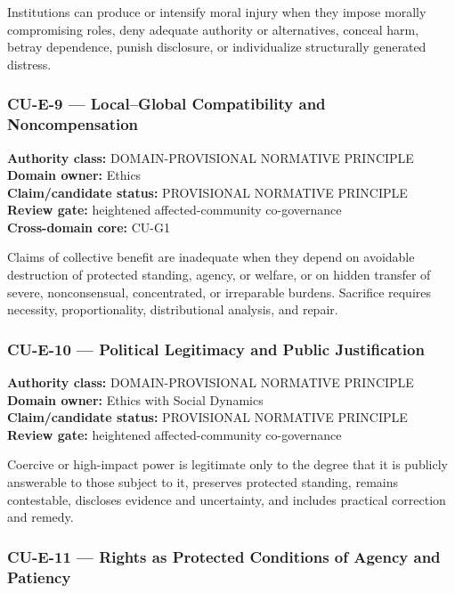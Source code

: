 \documentclass[
  11pt,
]{article}
\begin{document}
Institutions can produce or intensify moral injury when they impose
morally compromising roles, deny adequate authority or alternatives,
conceal harm, betray dependence, punish disclosure, or individualize
structurally generated distress.

\subsubsection{CU-E-9 --- Local--Global Compatibility and
Noncompensation}\label{cu-e-9-localglobal-compatibility-and-noncompensation}

\textbf{Authority class:} DOMAIN-PROVISIONAL NORMATIVE PRINCIPLE\\
\textbf{Domain owner:} Ethics\\
\textbf{Claim/candidate status:} PROVISIONAL NORMATIVE PRINCIPLE\\
\textbf{Review gate:} heightened affected-community co-governance\\
\textbf{Cross-domain core:} CU-G1

Claims of collective benefit are inadequate when they depend on
avoidable destruction of protected standing, agency, or welfare, or on
hidden transfer of severe, nonconsensual, concentrated, or irreparable
burdens. Sacrifice requires necessity, proportionality, distributional
analysis, and repair.

\subsubsection{CU-E-10 --- Political Legitimacy and Public
Justification}\label{cu-e-10-political-legitimacy-and-public-justification}

\textbf{Authority class:} DOMAIN-PROVISIONAL NORMATIVE PRINCIPLE\\
\textbf{Domain owner:} Ethics with Social Dynamics\\
\textbf{Claim/candidate status:} PROVISIONAL NORMATIVE PRINCIPLE\\
\textbf{Review gate:} heightened affected-community co-governance

Coercive or high-impact power is legitimate only to the degree that it
is publicly answerable to those subject to it, preserves protected
standing, remains contestable, discloses evidence and uncertainty, and
includes practical correction and remedy.

\subsubsection{CU-E-11 --- Rights as Protected Conditions of Agency and
Patiency}\label{cu-e-11-rights-as-protected-conditions-of-agency-and-patiency}
\end{document}

